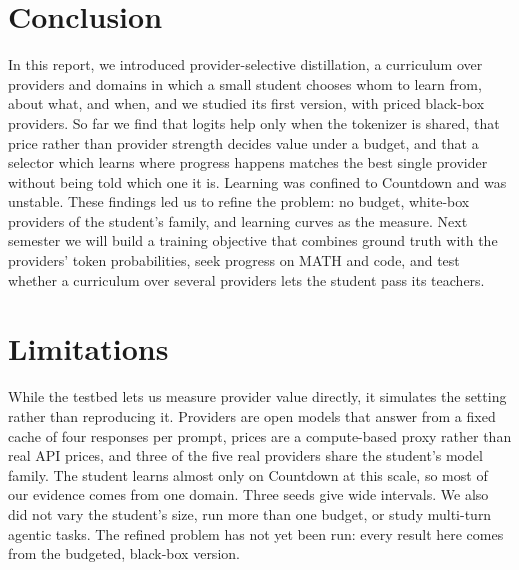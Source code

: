 \chapter{Conclusion}
\label{ca:chap:conclusion}

In this report, we introduced provider-selective distillation, a curriculum over providers
and domains in which a small student chooses whom to learn from, about what, and when, and
we studied its first version, with priced black-box providers. So far we find that logits
help only when the tokenizer is shared, that price rather than provider strength decides
value under a budget, and that a selector which learns where progress happens matches the
best single provider without being told which one it is. Learning was confined to
Countdown and was unstable. These findings led us to refine the problem: no budget,
white-box providers of the student's family, and learning curves as the measure. Next
semester we will build a training objective that combines ground truth with the providers'
token probabilities, seek progress on MATH and code, and test whether a curriculum over
several providers lets the student pass its teachers.

\chapter*{Limitations}
\label{ca:chap:limitations}

While the testbed lets us measure provider value directly, it simulates the setting rather
than reproducing it. Providers are open models that answer from a fixed cache of four
responses per prompt, prices are a compute-based proxy rather than real API prices, and
three of the five real providers share the student's model family. The student learns
almost only on Countdown at this scale, so most of our evidence comes from one domain. Three
seeds give wide intervals. We also did not vary the student's size, run more than one
budget, or study multi-turn agentic tasks. The
refined problem has not yet been run: every result here comes from the budgeted, black-box
version.
